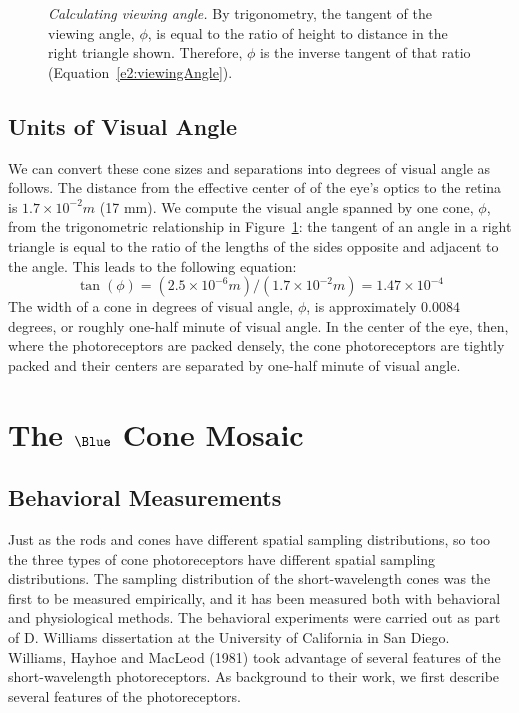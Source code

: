 \begin{figure}
\centerline{
}
\caption[Calculating Viewing Angle]{
{\em Calculating viewing angle.}
By trigonometry, the tangent of the viewing angle, $\phi$,
is equal to the ratio of height to distance in the right triangle shown.
Therefore, $\phi$ is the inverse tangent of that ratio
(Equation~\ref{e2:viewingAngle}).
}
\label{f2:viewingangle}
\end{figure}

\subsection*{Units of Visual Angle}
We can convert these cone sizes and separations
into degrees of visual angle as follows.
The distance from the effective center of
of the eye's optics to the retina is $1.7 \times 10^{-2} m$
(17 mm).
We compute the visual angle spanned by one cone,
$ \phi $, from the trigonometric relationship in 
Figure~\ref{f2:viewingangle}:
the tangent of an angle in a right triangle is
equal to the ratio of the lengths of the sides 
opposite and adjacent to the angle.
This leads to the following equation:
\begin{equation}
\label{e2:viewingAngle}
\tan ( \phi ) 
  = { ( 2.5 \times 10 ^ {-6} m  ) } / { ( 1.7 \times 10 ^ {-2} m ) }
  = 1.47 \times 10 ^ {-4}
\end{equation}
The width of a cone
in degrees of visual angle, $\phi$, is
approximately $0.0084$ degrees,
or roughly one-half minute of visual angle.
In the center of the eye, then,
where the photoreceptors are packed densely,
the cone photoreceptors are tightly packed and
their centers are separated by one-half minute of visual angle.


\section{The $\Blue$ Cone Mosaic}

\subsection*{Behavioral Measurements}
Just as the rods and cones have different spatial
sampling distributions, so too
the three types of cone photoreceptors
have different spatial sampling distributions.
The sampling distribution of the short-wavelength cones
was the first to be measured empirically, and it
has been measured both with behavioral and physiological methods.
The behavioral experiments were carried out as part of 
D. Williams dissertation at the University of California in San Diego.
Williams, Hayhoe and MacLeod (1981)
took advantage of several features
of the short-wavelength photoreceptors.
As background to their work, we first describe several features of the
photoreceptors. 

